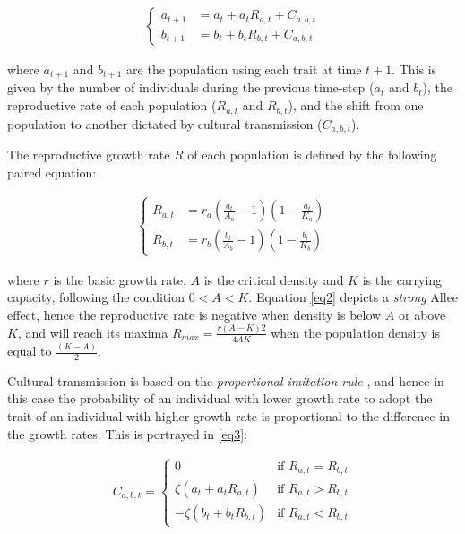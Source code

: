 \documentclass[preprint,authoryear]{elsarticle}
\begin{document}
\begin{align}
\begin{cases}
a_{t+1}& = a_t + a_t R_{a,t} + C_{a,b,t} \\
b_{t+1}& = b_t + b_t R_{b,t} + C_{a,b,t}
\end{cases}
\label{eq1}
\end{align}

where $a_{t+1}$ and $b_{t+1}$ are the population using each trait at time $t+1$. This is given by the number of individuals during the previous time-step ($a_t$ and $b_t$), the reproductive rate of each population ($R_{a,t}$ and $R_{b,t}$), and the shift from one population to another dictated by cultural transmission ($C_{a,b,t}$).

The reproductive growth rate $R$ of each population is defined by the following paired equation:

\begin{align}
\begin{cases}
R_{a,t}& = r_a (\frac{a_t}{A_a}-1)(1-\frac{a_t}{K_a})\\
R_{b,t}& = r_b (\frac{b_t}{A_b}-1)(1-\frac{b_t}{K_b}) 
\end{cases}
\label{eq2}
\end{align}

where $r$ is the basic growth rate, $A$ is the critical density and $K$ is the carrying capacity, following the condition $0<A < K$. Equation \eqref{eq2} depicts a \emph{strong} Allee effect, hence the reproductive rate is negative when density is below $A$ or above $K$, and will reach its maxima $R_{max}=\frac{r(A-K)2}{4AK}$ when the population density is equal to $\frac{(K-A)}{2}$. 

Cultural transmission is based on the \emph{proportional imitation rule} \citep{schlag1998}, and hence in this case the probability of an individual with lower growth rate to adopt the trait of an individual with higher growth rate is proportional to the difference in the growth rates. This is portrayed in \eqref{eq3}:

\begin{align}
\label{eq3}
C_{a,b,t} = 
\begin{cases}
0& \text{if } R_{a,t} = R_{b,t}\\
\zeta(a_t+a_tR_{a,t})& \text{if } R_{a,t} > R_{b,t}\\
-\zeta(b_t+b_tR_{b,t})& \text{if } R_{a,t} < R_{b,t}
\end{cases}
\end{align}
\end{document}
